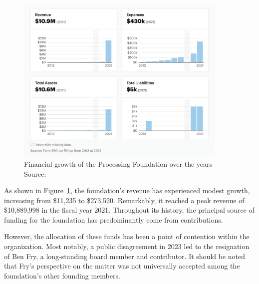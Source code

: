 \begin{figure}[h]
	\centering
	\includegraphics[width=0.9\textwidth]{images/foundation-finances.png}
	\caption{Financial growth of the Processing Foundation over the years Source: \parencite{ProcessingFoundationNonprofit2013}}
	\label{fig:foundation-finances}
\end{figure}

As shown in Figure~\ref{fig:foundation-finances}, the foundation's revenue has experienced modest growth, increasing from \$11,235 to \$273,520. Remarkably, it reached a peak revenue of \$10,889,998 in the fiscal year 2021. Throughout its history, the principal source of funding for the foundation has predominantly come from contributions.

However, the allocation of these funds has been a point of contention within the organization. Most notably, a public disagreement in 2023 led to the resignation of Ben Fry, a long-standing board member and contributor. It should be noted that Fry's perspective on the matter was not universally accepted among the foundation's other founding members. \parencite{benfry[@ben_fry]HaveMadeExtremely2023} \parencite{caseyreas[@reas]EarlierThisWeek2023} \parencite{danielshiffman[@shiffman]WouldPostNote2023}

